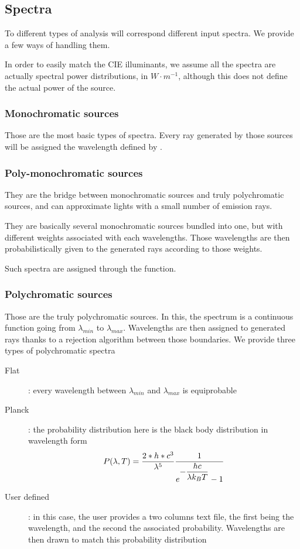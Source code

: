 \subsection{Spectra}

To different types of analysis will correspond different input spectra. We provide a few ways of handling them.

In order to easily match the CIE illuminants, we assume all the spectra are actually spectral power distributions, in $W\cdot m^{-1}$, although this does not define the actual power of the source.

\subsubsection{Monochromatic sources}

Those are the most basic types of spectra. Every ray generated by those sources will be assigned the wavelength defined by .

\subsubsection{Poly-monochromatic sources}

They are the bridge between monochromatic sources and truly polychromatic sources, and can approximate lights with a small number of emission rays.

They are basically several monochromatic sources bundled into one, but with different weights associated with each wavelengths. Those wavelengths are then probabilistically given to the generated rays according to those weights.

Such spectra are assigned through the  function.

\subsubsection{Polychromatic sources}

Those are the truly polychromatic sources. In this, the spectrum is a continuous function going from $\lambda_{min}$ to $\lambda_{max}$. Wavelengths are then assigned to generated rays thanks to a rejection algorithm between those boundaries. We provide three types of polychromatic spectra
\begin{description}
	\item[Flat]: every wavelength between $\lambda_{min}$ and $\lambda_{max}$ is equiprobable
	\item[Planck]: the probability distribution here is the black body distribution in wavelength form
	\begin{equation}
		P(\lambda,T)=\frac{2*h*c^3}{\lambda^5}\frac{1}{e^{\displaystyle -\frac{hc}{\lambda k_B T}}-1}
	\end{equation}
	\item[User defined]: in this case, the user provides a two columns text file, the first being the wavelength, and the second the associated probability. Wavelengths are then drawn to match this probability distribution
\end{description}

